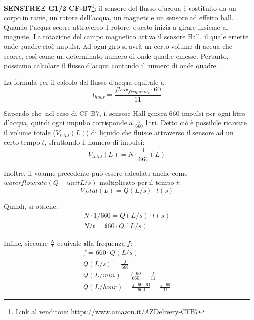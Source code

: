 \textbf{SENSTREE G1/2 CF-B7}\footnote{Link al venditore: \href{https://www.amazon.it/Interruttore-Misuratore-Contatore-Flussometro-Temperatura/dp/B07QNMZ7ZK}{https://www.amazon.it/AZDelivery-CFB7}}: il sensore del flusso d'acqua è costituito da un corpo in rame, un rotore dell'acqua, un magnete e un sensore ad effetto hall. Quando l'acqua scorre attraverso il rotore, questo inizia a girare insieme al magnete. La rotazione del campo magnetico attiva il sensore Hall, il quale emette onde quadre cioè impulsi. Ad ogni giro si avrà un certo volume di acqua che scorre, così come un determinato numero di onde quadre emesse. Pertanto, possiamo calcolare il flusso d'acqua contando il numero di onde quadre.

La formula per il calcolo del flusso d'acqua equivale a:
\[l_{hour} = \frac{flow_{frequency} \cdot 60}{11}\]

Sapendo che, nel caso di CF-B7, il sensore Hall genera 660 impulsi per ogni litro d'acqua, quindi ogni impulso corrisponde a $\frac{1}{660}$ litri. Detto ciò è possibile ricavare il volume totale ($V_{total}(L)$) di liquido che fluisce attraverso il sensore ad un certo tempo $t$, sfruttando il numero di impulsi:
\[V_{total}(L) = N \cdot \frac{1}{660}(L) \]

Inoltre, il volume precedente può essere calcolato anche come $water flow rate(Q - unit L/s)$ moltiplicato per il tempo $t$:
\[V_total(L) = Q(L/s) \cdot t(s) \]

Quindi, si ottiene:
\begin{gather*}
    N \cdot 1/660 = Q(L/s) \cdot t(s) \\
    N/t = 660 \cdot Q(L/s)
\end{gather*}

Infine, siccome $\frac{N}{t}$ equivale alla frequenza $f$:
\begin{gather*}
    f = 660 \cdot Q(L/s) \\
    Q(L/s) = \frac{f}{660} \\
    Q(L/min) = \frac{f \cdot 60}{660} = \frac{f}{11} \\
    Q(L/hour) = \frac{f \cdot 60 \cdot 60}{660} = \frac{f \cdot 60}{11} 
\end{gather*}

